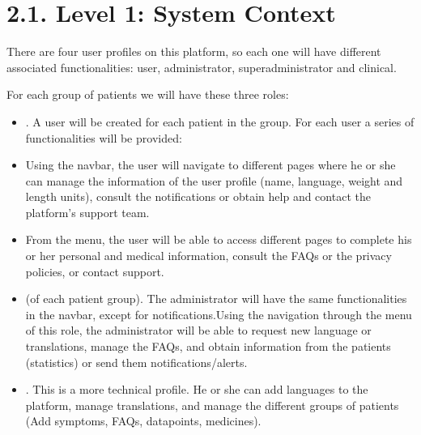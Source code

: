\documentclass[letterpaper,10pt,english]{sphinxmanual}
\begin{document}
\chapter{2.1. Level 1: System Context}
\label{\detokenize{pages/SW/SystemContext:level-1-system-context}}\label{\detokenize{pages/SW/SystemContext::doc}}
There are four user profiles on this platform, so each one will have different associated functionalities: user, administrator, superadministrator and clinical.



For each group of patients we will have these three roles:
\begin{itemize}
\item {} 
.  A user will be created for each patient in the group. For each user a series of functionalities will be provided:

\end{itemize}
\begin{itemize}
\item {} 
Using the navbar, the user will navigate to different pages where he or she can manage the information of the user profile (name, language, weight and length units), consult the notifications or obtain help and contact the platform’s support team.

\item {} 
From the menu, the user will be able to access different pages to complete his or her personal and medical information, consult the FAQs or the privacy policies, or contact support.

\end{itemize}
\begin{itemize}
\item {} 
 (of each patient group). The administrator will have the same functionalities in the navbar, except for notifications.Using the navigation through the menu of this role, the administrator will be able to request new language or translations, manage the FAQs, and obtain information from the patients (statistics) or send them notifications/alerts.

\item {} 
. This is a more technical profile. He or she can add languages to the platform, manage translations, and manage the different groups of patients (Add symptoms, FAQs, datapoints, medicines).

\end{itemize}
\end{document}
